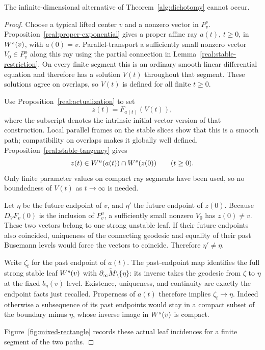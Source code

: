 \begin{proposition}\label{real:infinite-excluded}
The infinite-dimensional alternative of
Theorem~\ref{alg:dichotomy} cannot occur.
\end{proposition}

\begin{proof}
Choose a typical lifted center $v$ and a nonzero vector in $P^s_v$.
Proposition~\ref{real:proper-exponential} gives a proper affine ray
$a(t)$, $t\ge0$, in $W^s(v)$, with $a(0)=v$.
Parallel-transport a sufficiently small nonzero vector
$V_0\in P^u_v$ along this ray using the partial connection in
Lemma~\ref{real:stable-restriction}. On every finite segment this
is an ordinary smooth linear differential equation and therefore
has a solution $V(t)$ throughout that segment. These solutions
agree on overlaps, so $V(t)$ is defined for all finite $t\ge0$.

Use Proposition~\ref{real:actualization} to set
\[
 z(t)=F_{a(t)}(V(t)),
\]
where the subscript denotes the intrinsic initial-vector version
of that construction. Local parallel frames on the stable slices
show that this is a smooth path; compatibility on overlaps makes
it globally well defined. Proposition~\ref{real:stable-tangency}
gives
\[
 z(t)\in W^u(a(t))\cap W^s(z(0))
 \qquad(t\ge0).
\]
Only finite parameter values on compact ray segments have been
used, so no boundedness of $V(t)$ as $t\to\infty$ is needed.

Let $\eta$ be the future endpoint of $v$, and $\eta'$ the future
endpoint of $z(0)$. Because $D_VF_v(0)$ is the inclusion of
$P^u_v$, a sufficiently small nonzero $V_0$ has $z(0)\ne v$.
These two vectors belong to one strong unstable leaf. If their
future endpoints also coincided, uniqueness of the connecting
geodesic and equality of their past Busemann levels would force
the vectors to coincide. Therefore $\eta'\ne\eta$.

Write $\zeta_t$ for the past endpoint of $a(t)$. The past-endpoint
map identifies the full strong stable leaf $W^s(v)$ with
$\partial_\infty\widetilde M\setminus\{\eta\}$: its inverse
takes the geodesic from $\zeta$ to $\eta$ at the fixed
$b_\eta(v)$ level. Existence, uniqueness, and continuity are exactly
the endpoint facts just recalled. Properness of $a(t)$ therefore
implies $\zeta_t\to\eta$. Indeed otherwise a subsequence of its
past endpoints would stay in a compact subset of the boundary
minus $\eta$, whose inverse image in $W^s(v)$ is compact.

Figure~\ref{fig:mixed-rectangle} records these actual leaf incidences
for a finite segment of the two paths.



\end{proof}
